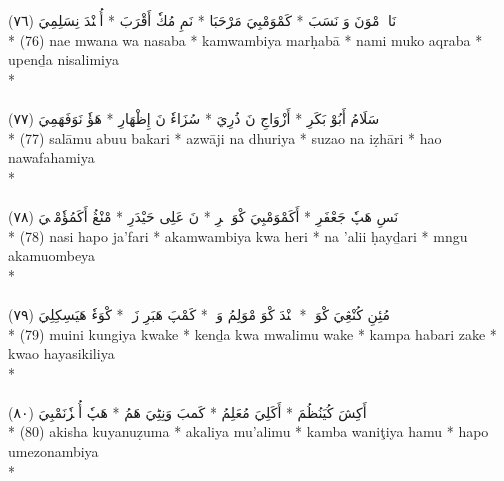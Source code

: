 \documentclass[a4paper, 12pt]{report}
\begin{document}
\begin{center}
\textarabic{(٧٦) \textcolor{mygreen}{نَاءٖ مْوَنَ وَ نَسَبَ  * كَمْوَمْبِيَ مَرْحَبَا  * نَمِ مُكٗ أَقْرَبَ  * أُپٖنْدَ نِسَلِمِيَ }} \\* 
(76) nae mwana wa nasaba  * kamwambiya marḥabā  * nami muko aqraba  * upenḏa nisalimiya  \\* 
 \\ 
\\[8mm] 

\textarabic{(٧٧) \textcolor{mygreen}{سَلَامُ أَبُوْ بَكَرِ  * أَزْوَاجِ نَ ذُرِيَ  * سُزَاءٗ نَ إِظْهَارِ  * هَؤٗ نَوَفَهَمِيَ }} \\* 
(77) salāmu abuu bakari  * azwāji na dhuriya  * suzao na iẓhāri  * hao nawafahamiya  \\* 
 \\ 
\\[8mm] 

\textarabic{(٧٨) \textcolor{mygreen}{نَسِ هَپٗ جَعْفَرِ  * أَكَمْوَمْبِيَ كْوَ هٖرِ  * نَ عَلِى حَيْدَرِ  * مْنْڠُ أَكَمُؤٗمْبٖيَ }} \\* 
(78) nasi hapo ja'fari  * akamwambiya kwa heri  * na 'alii ḥayḏari  * mngu akamuombeya  \\* 
 \\ 
\\[8mm] 

\textarabic{(٧٩) \textcolor{mygreen}{مُئِنِ كُنْڠِيَ كْوَكٖ  * كٖنْدَ كْوَ مْوَلِمُ وَكٖ  * كَمْپَ هَبَرِ زَكٖ  * كْوَءٗ هَيَسِكِلِيَ }} \\* 
(79) muini kungiya kwake  * kenḏa kwa mwalimu wake  * kampa habari zake  * kwao hayasikiliya  \\* 
 \\ 
\\[8mm] 

\textarabic{(٨٠) \textcolor{mygreen}{أَكِشَ كُيَنُظُمَ  * أَكَلِيَ مُعَلِمُ  * كَمبَ وَنِٹِيَ هَمُ  * هَپٗ أُمٖزٗنَمْبِيَ }} \\* 
(80) akisha kuyanuẓuma  * akaliya mu'alimu  * kamba waniţiya hamu  * hapo umezonambiya  \\* 
 \\ 
\\[8mm] 


\end{center}
\end{document}
